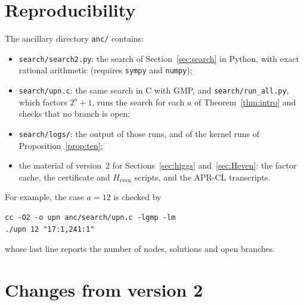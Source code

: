\documentclass[11pt]{amsart}
\theoremstyle{plain}
\theoremstyle{definition}
\begin{document}
\section{Reproducibility}\label{sec:repro}

The ancillary directory \texttt{anc/} contains:
\begin{itemize}[leftmargin=*]
\item \texttt{search/search2.py}: the search of Section~\ref{sec:search} in
Python, with exact rational arithmetic (requires \texttt{sympy} and
\texttt{numpy});
\item \texttt{search/upn.c}: the same search in C with GMP, and
\texttt{search/run\_all.py}, which factors $2^a+1$, runs the search for each
$a$ of Theorem~\ref{thm:intro} and checks that no branch is open;
\item \texttt{search/logs/}: the output of those runs, and of the kernel runs of
Proposition~\ref{prop:ten};
\item the material of version~2 for Sections~\ref{sec:higgs}
and~\ref{sec:Heven}: the factor cache, the certificate and $H_{\mathrm{even}}$
scripts, and the APR-CL transcripts.
\end{itemize}
For example, the case $a=12$ is checked by
\begin{verbatim}
cc -O2 -o upn anc/search/upn.c -lgmp -lm
./upn 12 "17:1,241:1"
\end{verbatim}
whose last line reports the number of nodes, solutions and open branches.

\section{Changes from version 2}\label{sec:changes}
\end{document}
